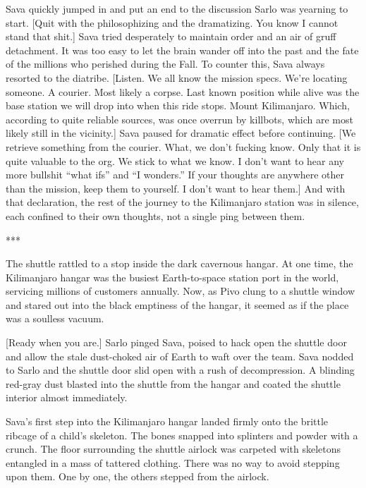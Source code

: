 Sava quickly jumped in and put an end to the discussion Sarlo was yearning to start. [Quit with the philosophizing and the dramatizing. You know I cannot stand that shit.] Sava tried desperately to maintain order and an air of gruff detachment. It was too easy to let the brain wander off into the past and the fate of the millions who perished during the Fall. To counter this, Sava always resorted to the diatribe. [Listen. We all know the mission specs. We're locating someone. A courier. Most likely a corpse. Last known position while alive was the base station we will drop into when this ride stops. Mount Kilimanjaro. Which, according to quite reliable sources, was once overrun by killbots, which are most likely still in the vicinity.] Sava paused for dramatic effect before continuing. [We retrieve something from the courier. What, we don't fucking know. Only that it is quite valuable to the org. We stick to what we know. I don't want to hear any more bullshit ``what ifs'' and ``I wonders.'' If your thoughts are anywhere other than the mission, keep them to yourself. I don't want to hear them.] And with that declaration, the rest of the journey to the Kilimanjaro station was in silence, each confined to their own thoughts, not a single ping between them.

\begin{center} *** \end{center}

The shuttle rattled to a stop inside the dark cavernous hangar. At one time, the Kilimanjaro hangar was the busiest Earth-to-space station port in the world, servicing millions of customers annually. Now, as Pivo clung to a shuttle window and stared out into the black emptiness of the hangar, it seemed as if the place was a soulless vacuum.

[Ready when you are.] Sarlo pinged Sava, poised to hack open the shuttle door and allow the stale dust-choked air of Earth to waft over the team. Sava nodded to Sarlo and the shuttle door slid open with a rush of decompression. A blinding red-gray dust blasted into the shuttle from the hangar and coated the shuttle interior almost immediately.

Sava's first step into the Kilimanjaro hangar landed firmly onto the brittle ribcage of a child's skeleton. The bones snapped into splinters and powder with a crunch. The floor surrounding the shuttle airlock was carpeted with skeletons entangled in a mass of tattered clothing. There was no way to avoid stepping upon them. One by one, the others stepped from the airlock.

